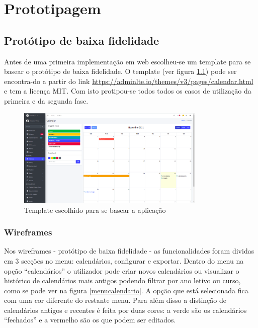 \documentclass[11pt, twoside]{report}
\begin{document}
	
	\chapter{Prototipagem}
	
	\section{Protótipo de baixa fidelidade}
	
	Antes de uma primeira implementação em web escolheu-se um template para se basear o protótipo de baixa fidelidade. O template (ver figura \ref{template}) pode ser encontra-do a partir do link \href{https://adminlte.io/themes/v3/pages/calendar.html}{https://adminlte.io/themes/v3/pages/calendar.html} e tem a licença MIT. Com isto protipou-se todos todos os casos de utilização da primeira e da segunda fase.
	
	\begin{figure}[H] 
		\centering 
		\includegraphics[width=0.8\textwidth,height=0.8\textheight,keepaspectratio]{image/template}
		\caption{Template escolhido para se basear a aplicação}
		\label{template}
	\end{figure}
	
	\subsection{Wireframes}
	
	Nos wireframes - protótipo de baixa fidelidade - as funcionalidades foram dividas em 3 secções no menu: calendários, configurar e exportar. Dentro do menu na opção ``calendários'' o utilizador pode criar novos calendários ou visualizar o histórico de calendários mais antigos podendo filtrar por ano letivo ou curso, como se pode ver na figura \ref{menucalendario}. A opção que está selecionada fica com uma cor diferente do restante menu. Para além disso a distinção de calendários antigos e recentes é feita por duas cores: a verde são os calendários ``fechados'' e a vermelho são os que podem ser editados. 
	
\end{document}
